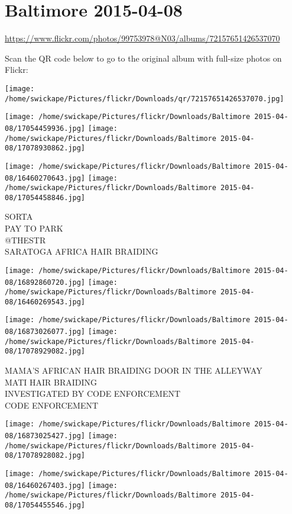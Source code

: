 \documentclass[10pt,letterpaper]{article}
\title{}
\author{}
\date{}
\begin{document}
\section*{Baltimore 2015-04-08}

\url{https://www.flickr.com/photos/99753978@N03/albums/72157651426537070}

Scan the QR code below to go to the original album with full-size photos on Flickr:

\texttt{[image: /home/swickape/Pictures/flickr/Downloads/qr/72157651426537070.jpg]}
\pagebreak

\texttt{[image: /home/swickape/Pictures/flickr/Downloads/Baltimore 2015-04-08/17054459936.jpg]}
\texttt{[image: /home/swickape/Pictures/flickr/Downloads/Baltimore 2015-04-08/17078930862.jpg]}

\texttt{[image: /home/swickape/Pictures/flickr/Downloads/Baltimore 2015-04-08/16460270643.jpg]}
\texttt{[image: /home/swickape/Pictures/flickr/Downloads/Baltimore 2015-04-08/17054458846.jpg]}

SORTA\\
PAY TO PARK\\
@THESTR\\
SARATOGA AFRICA HAIR BRAIDING
\pagebreak

\texttt{[image: /home/swickape/Pictures/flickr/Downloads/Baltimore 2015-04-08/16892860720.jpg]}
\texttt{[image: /home/swickape/Pictures/flickr/Downloads/Baltimore 2015-04-08/16460269543.jpg]}

\texttt{[image: /home/swickape/Pictures/flickr/Downloads/Baltimore 2015-04-08/16873026077.jpg]}
\texttt{[image: /home/swickape/Pictures/flickr/Downloads/Baltimore 2015-04-08/17078929082.jpg]}

MAMA'S AFRICAN HAIR BRAIDING DOOR IN THE ALLEYWAY\\
MATI HAIR BRAIDING\\
INVESTIGATED BY CODE ENFORCEMENT\\
CODE ENFORCEMENT
\pagebreak

\texttt{[image: /home/swickape/Pictures/flickr/Downloads/Baltimore 2015-04-08/16873025427.jpg]}
\texttt{[image: /home/swickape/Pictures/flickr/Downloads/Baltimore 2015-04-08/17078928082.jpg]}

\texttt{[image: /home/swickape/Pictures/flickr/Downloads/Baltimore 2015-04-08/16460267403.jpg]}
\texttt{[image: /home/swickape/Pictures/flickr/Downloads/Baltimore 2015-04-08/17054455546.jpg]}
\end{document}
